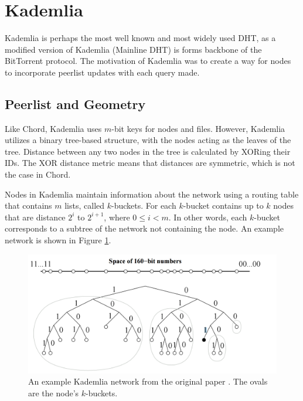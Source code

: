




\section{Kademlia}
Kademlia \cite{kademlia}  is perhaps the most well known and most widely used DHT, as a modified version of Kademlia (Mainline DHT) is forms backbone of the BitTorrent protocol.
The motivation of Kademlia was to create a way for nodes to incorporate peerlist updates with each query made.


\subsection*{Peerlist and Geometry}
Like Chord, Kademlia uses $m$-bit keys for nodes and files.
However, Kademlia utilizes a binary tree-based structure, with the nodes acting as the leaves of the tree.
Distance between any two nodes in the tree  is calculated by XORing their IDs.
The XOR distance metric means that distances are symmetric, which is not the case in Chord.


Nodes in Kademlia maintain information about the network using a routing table that contains  $m$ lists, called $k$-buckets.
For each $k$-bucket contains up to $k$ nodes that are distance $2^i$ to $2^{i+1}$, where $0 \leq i < m$.
In other words, each $k$-bucket corresponds to a subtree of the network not containing the node.
An example network is shown in Figure \ref{fig:kademlia}.

\begin{figure}
	\centering
	\includegraphics[width=0.7\linewidth]{figs/kademlia}
	\caption{An example Kademlia network from the original paper \cite{kademlia}. The ovals are the node's $k$-buckets.}
	\label{fig:kademlia}
\end{figure}




